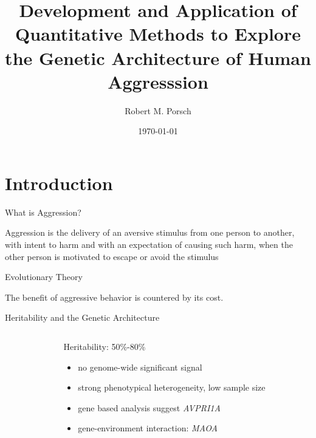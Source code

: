 \documentclass{beamer}
\title{Development and Application of Quantitative Methods to Explore the Genetic Architecture of Human Aggresssion}
\date{\today}
\author{Robert M. Porsch}
\institute{Department of Psychiatry}
\begin{document}
\maketitle
\tableofcontents

\section{Introduction}

\begin{frame}{What is Aggression?}
  \begin{center}
    \begin{displayquote}
      Aggression is the delivery of an aversive stimulus from one person to another, with intent to harm and with an expectation of causing such harm, when the other person is motivated to escape or avoid the stimulus
    \end{displayquote}
  \end{center}
\end{frame}

\begin{frame}[t]{Evolutionary Theory}
  \begin{center}
    \scalebox{0.7}{}
    The benefit of aggressive behavior is countered by its cost.
  \end{center}
\end{frame}

\begin{frame}[t]{Heritability and the Genetic Architecture}
  \begin{columns}
    \begin{column}{0.3\textwidth}
      \scalebox{0.5}{}
      \scalebox{0.5}{}
    \end{column}
    \begin{column}{0.7\textwidth}
      \begin{center}
        Heritability: 50\%-80\%~\cite{Porsch2016}
      \end{center}
      \begin{itemize}
        \item no genome-wide significant signal~\cite{Vassos2014}
        \item strong phenotypical heterogeneity, low sample size 
        \item gene based analysis suggest \textit{AVPRI1A} 
        \item gene-environment interaction: \textit{MAOA}
      \end{itemize}
    \end{column}
  \end{columns}

\end{frame}
\end{document}
